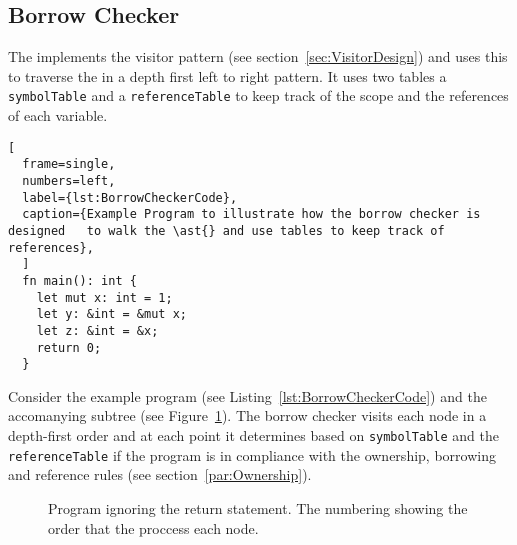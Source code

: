 \subsection{Borrow Checker}
\label{sec:BorrowCheckerDesign}

The \borrowChecker{} implements the visitor pattern (see
section~\ref{sec:VisitorDesign}) and uses this to traverse the \ast{} in a depth first
left to right pattern. It uses two tables a \texttt{symbolTable} and a
\texttt{referenceTable} to keep track of the scope and the
references of each variable.

\newpage

\begin{lstlisting}[
  frame=single,
  numbers=left,
  label={lst:BorrowCheckerCode},
  caption={Example Program to illustrate how the borrow checker is designed   to walk the \ast{} and use tables to keep track of references},
  ]
  fn main(): int {
    let mut x: int = 1;
    let y: &int = &mut x;
    let z: &int = &x;
    return 0;
  }
\end{lstlisting}

Consider the example program (see Listing~\ref{lst:BorrowCheckerCode}) and the
accomanying subtree (see Figure~\ref{fig:astBorrowCheckerDesignCode}). The borrow checker visits each node
in a depth-first order and at each point it determines based on \texttt{symbolTable}
and the \texttt{referenceTable} if the
program is in compliance with the ownership, borrowing and reference rules (see
section~\ref{par:Ownership}).

\begin{figure}[ht]
  \centering
  \caption{Program \ast{} ignoring the return statement. The numbering showing the
  order that the \borrowChecker{} proccess each node.}
  \label{fig:astBorrowCheckerDesignCode}
\end{figure}

